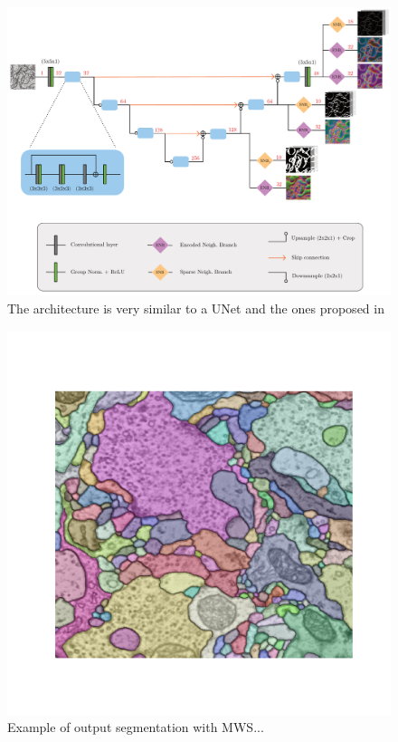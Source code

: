 \begin{figure}[t]
\centering
        \includegraphics[width=\textwidth]{./figs/UNet_architecture.pdf} %
        \caption{The architecture is very similar to a UNet and the ones proposed in \cite{lee2017superhuman,funke2018large}}
    \label{fig:comparing_masks_affs}
\end{figure}


\begin{figure}[t]
\centering
        \includegraphics[width=\textwidth,trim=1.80in 1.4in 1.8in 1.50in,clip]{./figs/MWS_segm.pdf} %
        \caption{Example of output segmentation with MWS...}
    \label{fig:MWS_segm}
\end{figure}

